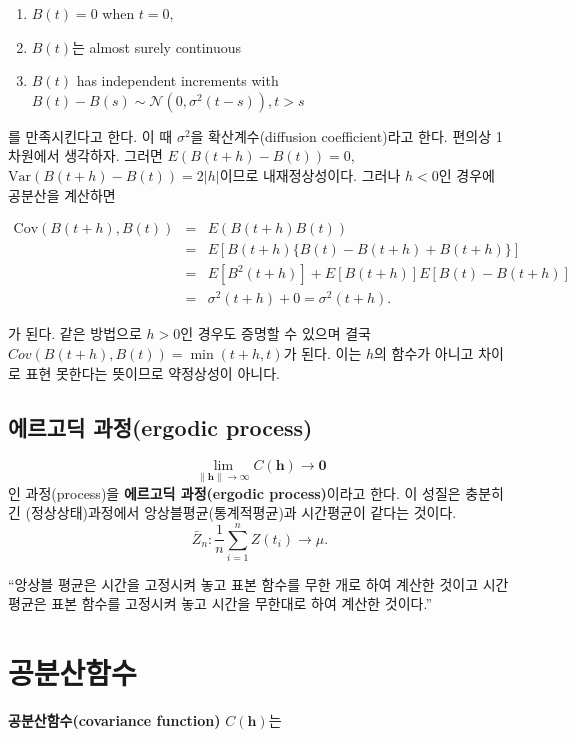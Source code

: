 \documentclass[b5paper,]{scrbook}
\providecommand{\tightlist}{%
  \setlength{\itemsep}{0pt}\setlength{\parskip}{0pt}}
\theoremstyle{plain}
\theoremstyle{definition}
\numberwithin{equation}{section}
\begin{document}
\begin{enumerate}
\def\labelenumi{\arabic{enumi}.}
\tightlist
\item
  \(B(t)=0\) when \(t=0\),
\item
  \(B(t)\)는 almost surely continuous
\item
  \(B(t)\) has independent increments with
  \(B(t)-B(s) \sim \mathcal{N}(0,\sigma^{2}(t-s)), t>s\)
\end{enumerate}

를 만족시킨다고 한다. 이 때 \(\sigma^{2}\)을 확산계수(diffusion
coefficient)라고 한다. 편의상 1차원에서 생각하자. 그러면
\(E(B(t+h)-B(t))=0\), \(\text{Var}(B(t+h)-B(t))=2|h|\)이므로
내재정상성이다. 그러나 \(h < 0\)인 경우에 공분산을 계산하면

\begin{eqnarray}
\text{Cov}(B(t+h),B(t)) &=& E(B(t+h)B(t))\nonumber\\
&=&E[B(t+h)\{B(t)-B(t+h)+B(t+h)\}]\nonumber\\
&=&E[B^{2}(t+h)]+E[B(t+h)]E[B(t)-B(t+h)]\nonumber\\
&=&\sigma^{2}(t+h)+0=\sigma^{2}(t+h).
\end{eqnarray}

가 된다. 같은 방법으로 \(h > 0\)인 경우도 증명할 수 있으며 결국
\(Cov(B(t+h),B(t))=\min (t+h,t)\)가 된다. 이는 \(h\)의 함수가 아니고
차이로 표현 못한다는 뜻이므로 약정상성이 아니다.

\section{에르고딕 과정(ergodic process)}\label{-ergodic-process}

\[\lim_{\|\mathbf{h}\| \rightarrow \infty}C(\mathbf{h}) \rightarrow \mathbf{0}\]
인 과정(process)을 \textbf{에르고딕 과정(ergodic process)}이라고 한다.
이 성질은 충분히 긴 (정상상태)과정에서 앙상블평균(통계적평균)과
시간평균이 같다는 것이다.
\[\bar{Z}_{n}:\frac{1}{n}\sum_{i=1}^{n}Z(t_{i}) \rightarrow \mu .\]

``앙상블 평균은 시간을 고정시켜 놓고 표본 함수를 무한 개로 하여 계산한
것이고 시간평균은 표본 함수를 고정시켜 놓고 시간을 무한대로 하여 계산한
것이다.''

\chapter{공분산함수}\label{covfct}

\textbf{공분산함수(covariance function)} \(C(\mathbf{h})\)는
\end{document}
